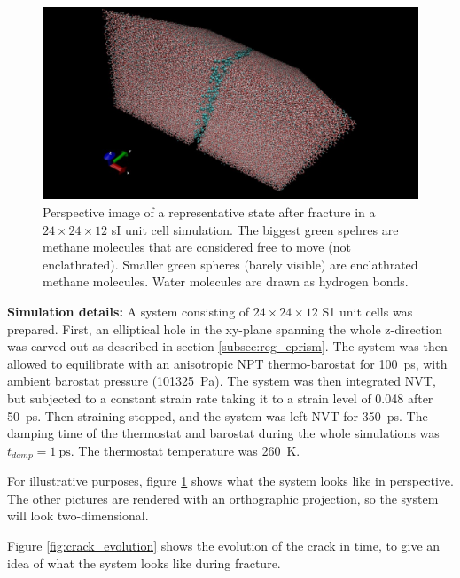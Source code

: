 \begin{figure}
\includegraphics[width=\textwidth]{../pictures/system_1048.pdf}
\caption{Perspective image of a representative state after fracture in a $24\times 24 \times 12$ sI unit cell simulation. The biggest green spehres are methane molecules that are considered free to move (not enclathrated). Smaller green spheres (barely visible) are enclathrated methane molecules. Water molecules are drawn as hydrogen bonds.}
\label{fig:system_1048}
\end{figure}

\begin{framed} 
\textbf{Simulation details:} A system consisting of $24 \times 24\times 12$ S1 unit cells was prepared. First, an elliptical hole in the xy-plane spanning the whole z-direction was carved out as described in section \ref{subsec:reg_eprism}. The system was then allowed to equilibrate with an anisotropic NPT thermo-barostat for \SI{100}{\pico\second}, with ambient barostat pressure (\SI{101325}{\pascal}). The system was then integrated NVT, but subjected to a constant strain rate taking it to a strain level of 0.048 after \SI{50}{\pico\second}. Then straining stopped, and the system was left NVT for \SI{350}{\pico\second}. The damping time of the thermostat and barostat during the whole simulations was $t_{damp} = \SI{1}{\ps}$. The thermostat temperature was \SI{260}{\kelvin}.
\end{framed}

For illustrative purposes, figure \ref{fig:system_1048} shows what the system looks like in perspective. The other pictures are rendered with an orthographic projection, so the system will look two-dimensional. 

Figure \ref{fig:crack_evolution} shows the evolution of the crack in time, to give an idea of what the system looks like during fracture. 

